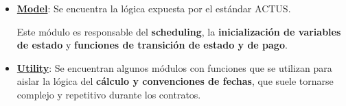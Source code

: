 \documentclass{beamer}
\newcommand{\nologo}{\setbeamertemplate{logo}{}} %
\begin{document}
\begin{frame}
    \begin{itemize}
        \item \textbf{\underline{Model}}: Se encuentra la lógica expuesta por el estándar ACTUS. 

            \medskip

            Este módulo es responsable del \textbf{scheduling}, la \textbf{inicialización de variables de estado} y \textbf{funciones de transición de estado y de pago}.

            \vfill
            \pause

        \item \textbf{\underline{Utility}}: Se encuentran algunos módulos con funciones que se utilizan para aislar la lógica del \textbf{cálculo y convenciones de fechas}, que suele tornarse complejo y repetitivo durante los contratos.
    \end{itemize}
\end{frame}

{\nologo
\begin{frame}[fragile]

\end{frame}
}
\end{document}
